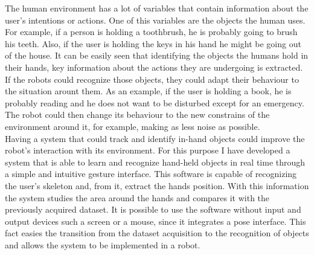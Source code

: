 The human environment has a lot of variables that contain information about the user's intentions or actions. 
One of this variables are the objects the human uses. 
For example, if a person is holding a toothbrush, he is probably going to brush his teeth. 
Also, if the user is holding the keys in his hand he might be going out of the house. 
It can be easily seen that identifying the objects the humans hold in their hands, key information about the actions they are undergoing is extracted. 
If the robots could recognize those objects, they could adapt their behaviour to the situation arount them. 
As an example, if the user is holding a book, he is probably reading and  he does not want to be disturbed except for an emergency. 
The robot could then change its behaviour to the new constrains of the environment around it, for example, making as less noise as possible. 
\\

Having a system that could track and identify in-hand objects could improve the robot's interaction with its environment.
For this purpose I have developed a system that is able to learn and recognize hand-held objects in real time through a simple and intuitive gesture interface. 
This software is capable of recognizing the user's skeleton and, from it, extract the hands position. 
With this information the system studies the area around the hands and compares it with the previously acquired dataset.
It is possible to use the software without input and output devices such a screen or a mouse, since it integrates a pose interface. 
This fact easies the transition from the dataset acquisition to the recognition of objects and allows the system to be implemented in a robot. 













% 






